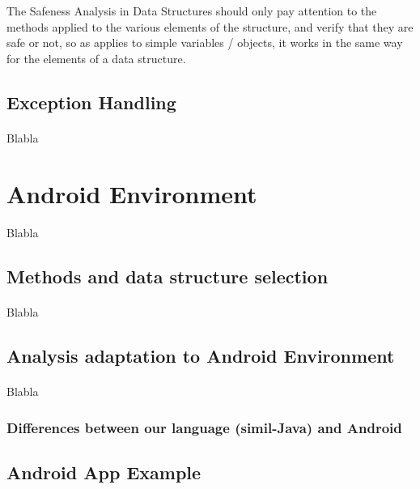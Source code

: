 \documentclass[letterpaper,twocolumn,10pt]{article}
\begin{document}
The Safeness Analysis in Data Structures should only pay attention to the methods applied to the various elements of the structure, and verify that they are safe or not, so as applies to simple variables / objects, it works in the same way for the elements of a data structure.


\subsection{Exception Handling}
\paragraph{}
Blabla


\section{Android Environment}
\paragraph{}
Blabla

\subsection{Methods and data structure selection}
\paragraph{}
Blabla

\subsection{Analysis adaptation to Android Environment}
\paragraph{}
Blabla

\subsubsection{Differences between our language (simil-Java) and Android}

\subsection{Android App Example}
\end{document}
